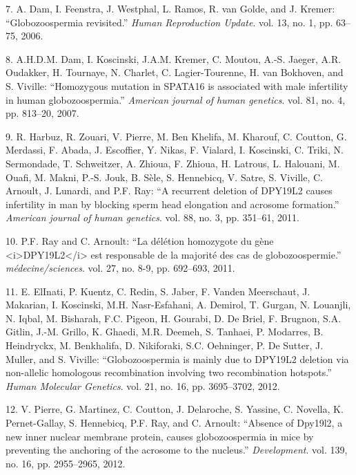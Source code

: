 \documentclass[12pt,twoside]{reedthesis}
\begin{document}
  \hypertarget{ref-Dam2006}{}
  7. A. Dam, I. Feenstra, J. Westphal, L. Ramos, R. van Golde, and J.
  Kremer: ``Globozoospermia revisited.'' \emph{Human Reproduction Update}.
  vol. 13, no. 1, pp. 63--75, 2006.
  
  \hypertarget{ref-Dam2007}{}
  8. A.H.D.M. Dam, I. Koscinski, J.A.M. Kremer, C. Moutou, A.-S. Jaeger,
  A.R. Oudakker, H. Tournaye, N. Charlet, C. Lagier-Tourenne, H. van
  Bokhoven, and S. Viville: ``Homozygous mutation in SPATA16 is associated
  with male infertility in human globozoospermia.'' \emph{American journal
  of human genetics}. vol. 81, no. 4, pp. 813--20, 2007.
  
  \hypertarget{ref-Harbuz2011}{}
  9. R. Harbuz, R. Zouari, V. Pierre, M. Ben Khelifa, M. Kharouf, C.
  Coutton, G. Merdassi, F. Abada, J. Escoffier, Y. Nikas, F. Vialard, I.
  Koscinski, C. Triki, N. Sermondade, T. Schweitzer, A. Zhioua, F. Zhioua,
  H. Latrous, L. Halouani, M. Ouafi, M. Makni, P.-S. Jouk, B. Sèle, S.
  Hennebicq, V. Satre, S. Viville, C. Arnoult, J. Lunardi, and P.F. Ray:
  ``A recurrent deletion of DPY19L2 causes infertility in man by blocking
  sperm head elongation and acrosome formation.'' \emph{American journal
  of human genetics}. vol. 88, no. 3, pp. 351--61, 2011.
  
  \hypertarget{ref-Ray2011}{}
  10. P.F. Ray and C. Arnoult: ``La délétion homozygote du gène
  \textless{}i\textgreater{}DPY19L2\textless{}/i\textgreater{} est
  responsable de la majorité des cas de globozoospermie.''
  \emph{médecine/sciences}. vol. 27, no. 8-9, pp. 692--693, 2011.
  
  \hypertarget{ref-ElInati2012}{}
  11. E. ElInati, P. Kuentz, C. Redin, S. Jaber, F. Vanden Meerschaut, J.
  Makarian, I. Koscinski, M.H. Nasr-Esfahani, A. Demirol, T. Gurgan, N.
  Louanjli, N. Iqbal, M. Bisharah, F.C. Pigeon, H. Gourabi, D. De Briel,
  F. Brugnon, S.A. Gitlin, J.-M. Grillo, K. Ghaedi, M.R. Deemeh, S.
  Tanhaei, P. Modarres, B. Heindryckx, M. Benkhalifa, D. Nikiforaki, S.C.
  Oehninger, P. De Sutter, J. Muller, and S. Viville: ``Globozoospermia is
  mainly due to DPY19L2 deletion via non-allelic homologous recombination
  involving two recombination hotspots.'' \emph{Human Molecular Genetics}.
  vol. 21, no. 16, pp. 3695--3702, 2012.
  
  \hypertarget{ref-Pierre2012}{}
  12. V. Pierre, G. Martinez, C. Coutton, J. Delaroche, S. Yassine, C.
  Novella, K. Pernet-Gallay, S. Hennebicq, P.F. Ray, and C. Arnoult:
  ``Absence of Dpy19l2, a new inner nuclear membrane protein, causes
  globozoospermia in mice by preventing the anchoring of the acrosome to
  the nucleus.'' \emph{Development}. vol. 139, no. 16, pp. 2955--2965,
  2012.
  
\end{document}
